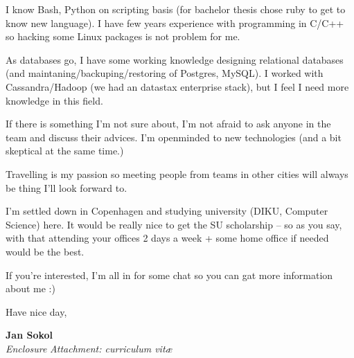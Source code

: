 \documentclass[11pt]{article}
\begin{document}
I know Bash, Python on scripting basis (for bachelor thesis chose ruby to get to know new language). I have few years experience with programming in C/C++ so hacking some Linux packages is not problem for me.

As databases go, I have some working knowledge designing relational databases (and maintaning/backuping/restoring of Postgres, MySQL). I worked with Cassandra/Hadoop (we had an datastax enterprise stack), but I feel I need more knowledge in this field.

If there is something I'm not sure about, I'm not afraid to ask anyone in the team and discuss their advices. I'm openminded to new technologies (and a bit skeptical at the same time.)

Travelling is my passion so meeting people from teams in other cities will always be thing I'll look forward to.

I'm settled down in Copenhagen and studying university (DIKU, Computer Science) here. It would be really nice to get the SU scholarship -- so as you say, with that attending your offices 2 days a week + some home office if needed would be the best.

If you're interested, I'm all in for some chat so you can gat more information about me :)


Have nice day,

{\bfseries Jan Sokol}\\
%
\vfill%
{\slshape Enclosure}
{\slshape Attachment: curriculum vit\ae{}}
\end{document}
